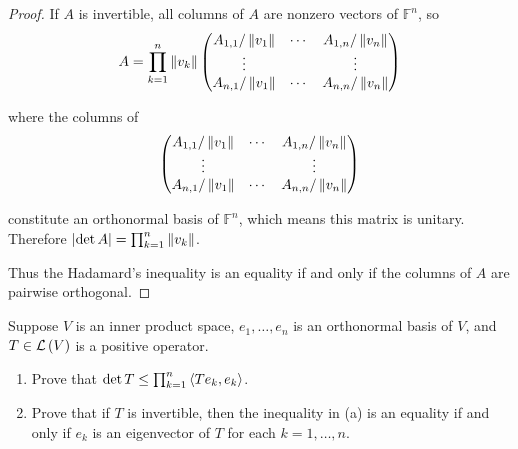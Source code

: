 \begin{proof}
    If $A$ is invertible, all columns of $A$ are nonzero vectors of $\mathbb{F}^{n}$, so
    \[
        A = \prod^{n}_{k=1}\left\Vert{v_{k}}\right\Vert\begin{pmatrix}
            A_{1,1}/\left\Vert{v_{1}}\right\Vert & \cdots & A_{1,n}/\left\Vert{v_{n}}\right\Vert \\
            \vdots               &        & \vdots               \\
            A_{n,1}/\left\Vert{v_{1}}\right\Vert & \cdots & A_{n,n}/\left\Vert{v_{n}}\right\Vert
        \end{pmatrix}
    \]

    where the columns of
    \[
        \begin{pmatrix}
            A_{1,1}/\left\Vert{v_{1}}\right\Vert & \cdots & A_{1,n}/\left\Vert{v_{n}}\right\Vert \\
            \vdots               &        & \vdots               \\
            A_{n,1}/\left\Vert{v_{1}}\right\Vert & \cdots & A_{n,n}/\left\Vert{v_{n}}\right\Vert
        \end{pmatrix}
    \]

    constitute an orthonormal basis of $\mathbb{F}^{n}$, which means this matrix is unitary. Therefore $\left\vert{\det A}\right\vert = \prod^{n}_{k=1}\left\Vert{v_{k}}\right\Vert$.

    Thus the Hadamard's inequality is an equality if and only if the columns of $A$ are pairwise orthogonal.
\end{proof}
\newpage

\begin{exercise}\label{chapter9:sectionC:exercise19}
    Suppose $V$ is an inner product space, $e_{1}, \ldots, e_{n}$ is an orthonormal basis of $V$, and $T\in\mathcal{L}\left({V}\right)$ is a positive operator.
    \begin{enumerate}[label={(\alph*)}]
        \item Prove that $\det T\leq \prod^{n}_{k=1}\left\langle{Te_{k}, e_{k}}\right\rangle$.
        \item Prove that if $T$ is invertible, then the inequality in (a) is an equality if and only if $e_{k}$ is an eigenvector of $T$ for each $k = 1,\ldots,n$.
    \end{enumerate}
\end{exercise}

